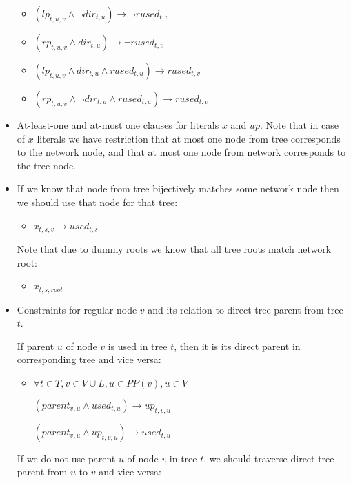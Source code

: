 \documentclass[runningheads, envcountsame, a4paper]{llncs}
\begin{document}
\begin{itemize}
    \begin{itemize}
    \item $(lp_{t,u,v} \wedge \neg dir_{t,u}) \rightarrow \neg rused_{t,v}$
    \item $(rp_{t,u,v} \wedge dir_{t,u}) \rightarrow \neg rused_{t,v}$
    \item $(lp_{t,u,v} \wedge dir_{t,u} \wedge rused_{t,u}) \rightarrow rused_{t,v}$
    \item $(rp_{t,u,v} \wedge \neg dir_{t,u} \wedge rused_{t,u}) \rightarrow rused_{t,v}$
    \end{itemize}
    
\item At-least-one and at-most one clauses for literals $x$ and $up$. Note that in case of $x$ literals we have restriction that at most one node from tree corresponds to the network node, and that at most one node from network corresponds to the tree node.

\item If we know that node from tree bijectively matches some network node then we should use that node for that tree:
    \begin{itemize}
	\item $x_{t,s,v} \rightarrow used_{t,s}$
    \end{itemize}
    Note that due to dummy roots we know that all tree roots match network root:
    \begin{itemize}
	\item $x_{t,s,root}$
    \end{itemize}

\item Constraints for regular node $v$ and its relation to direct tree parent from tree $t$.

	If parent $u$ of node $v$ is used in tree $t$, then it is its direct parent in corresponding tree and vice versa:

    \begin{itemize}
    \item $\forall t \in T,v \in V \cup L, u \in PP(v), u \in V$
    
    $(parent_{v,u} \wedge used_{t,u}) \rightarrow up_{t,v,u}$
    
    $(parent_{v,u} \wedge up_{t,v,u}) \rightarrow used_{t,u}$
	\end {itemize}
	
	If we do not use parent $u$ of node $v$ in tree $t$, we should traverse direct tree parent from $u$ to $v$ and vice versa:


\end{itemize}
\end{document}
